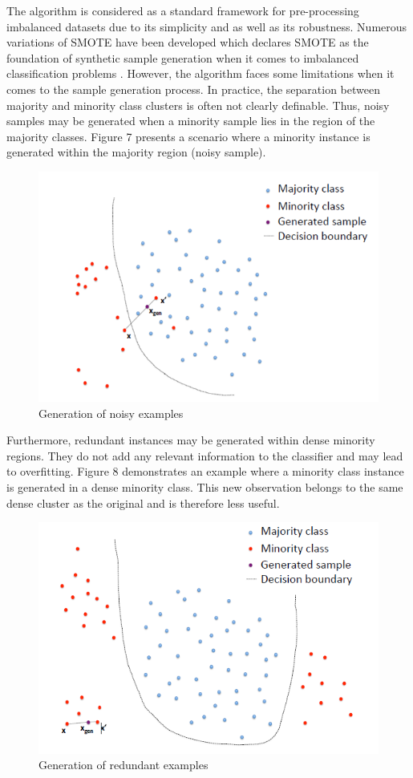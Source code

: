 \documentclass[parskip=full]{scrartcl}
\begin{document}
The algorithm is considered as a standard framework for pre-processing
imbalanced datasets due to its simplicity and as well as its robustness.
Numerous variations of SMOTE have been developed which declares SMOTE as the
foundation of synthetic sample generation when it comes to imbalanced
classification problems \cite{Fernandez.2018}. However, the algorithm faces some
limitations when it comes to the sample generation process. In practice, the
separation between majority and minority class clusters is often not clearly
definable. Thus, noisy samples may be generated when a minority sample lies in
the region of the majority classes. Figure 7 presents a scenario where a
minority instance is generated within the majority region (noisy sample).

\begin{figure}[H]
	\centering
	\includegraphics[width=0.6\linewidth]{"./resources/noisy_examples"}
	\caption{Generation of noisy examples}
	\label{fig:noisy-examples}
\end{figure}

Furthermore, redundant instances may be generated within dense minority regions.
They do not add any relevant information to the classifier and may lead to
overfitting. Figure 8 demonstrates an example where a minority class instance is
generated in a dense minority class. This new observation belongs to the same
dense cluster as the original and is therefore less useful. 

\begin{figure}[H]
	\centering
	\includegraphics[width=0.6\linewidth]{"./Resources/redundant_examples"}
	\caption{Generation of redundant examples}
	\label{fig:redundant-examples}
\end{figure}
\end{document}
